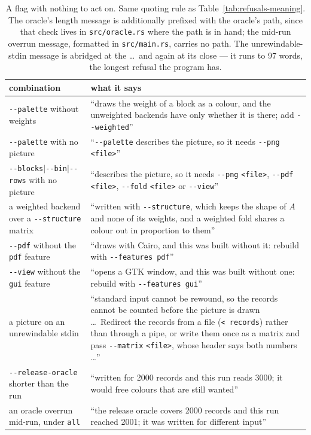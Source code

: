 \documentclass[11pt,a4paper]{article}
\newcommand{\bin}[1]{\texttt{#1}}
\newcommand{\flag}[1]{\texttt{-{}-#1}}
\begin{document}
\begin{table}[p]
\centering\small
\begin{tabular}{p{}p{}}
\toprule
combination & what it says \\
\midrule
\flag{palette} without weights & ``draws the weight of a block as a colour, and the unweighted backends have only whether it is there; add \flag{weighted}'' \\
\flag{palette} with no picture & ``\flag{palette} describes the picture, so it needs \flag{png} \texttt{<file>}'' \\
\flag{blocks}$|$\flag{bin}$|$\flag{rows} with no picture & ``describes the picture, so it needs \flag{png} \texttt{<file>}, \flag{pdf} \texttt{<file>}, \flag{fold} \texttt{<file>} or \flag{view}'' \\
a weighted backend over a \flag{structure} matrix & ``written with \flag{structure}, which keeps the shape of $A$ and none of its weights, and a weighted fold shares a colour out in proportion to them'' \\
\flag{pdf} without the \texttt{pdf} feature & ``draws with Cairo, and this was built without it: rebuild with \texttt{-{}-features pdf}'' \\
\flag{view} without the \texttt{gui} feature & ``opens a GTK window, and this was built without one: rebuild with \texttt{-{}-features gui}'' \\
a picture on an unrewindable stdin & ``standard input cannot be rewound, so the records cannot be counted before the picture is drawn \ldots\ Redirect the records from a file (\texttt{< records}) rather than through a pipe, or write them once as a matrix and pass \flag{matrix} \texttt{<file>}, whose header says both numbers \ldots'' \\
\flag{release-oracle} shorter than the run & ``written for 2000 records and this run reads 3000; it would free colours that are still wanted'' \\
an oracle overrun mid-run, under \texttt{all} & ``the release oracle covers 2000 records and this run reached 2001; it was written for different input'' \\
\bottomrule
\end{tabular}
\caption{A flag with nothing to act on. Same quoting rule as
Table~\ref{tab:refusals-meaning}. The oracle's length message is additionally
prefixed with the oracle's path, since that check lives in \bin{src/oracle.rs}
where the path is in hand; the mid-run overrun message, formatted in
\bin{src/main.rs}, carries no path. The unrewindable-stdin message is abridged
at the \ldots\ and again at its close --- it runs to 97 words, the longest
refusal the program has.}
\label{tab:refusals-empty}
\end{table}
\end{document}
